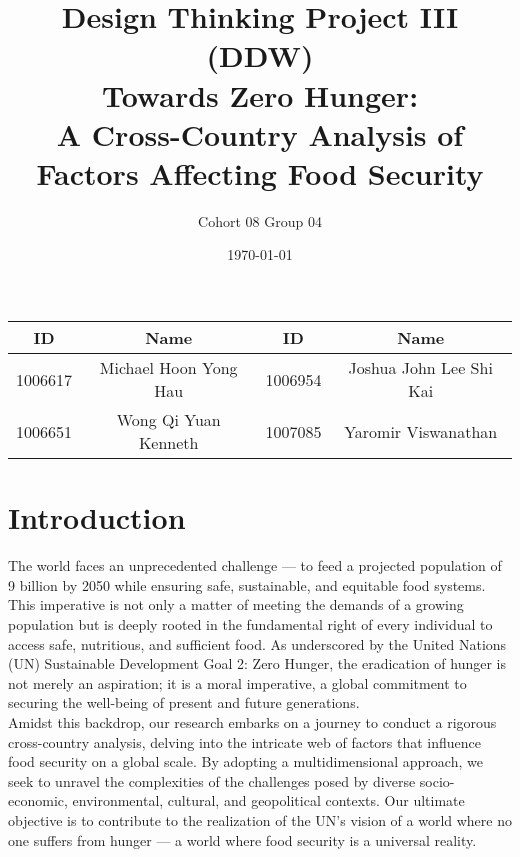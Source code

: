 \documentclass{article}
\title{\Bigg01.020 Design Thinking Project III (DDW) \\ Towards Zero Hunger: \\ A Cross-Country Analysis of Factors Affecting Food Security}
\author{Cohort 08 Group 04}
\date{\today}
\begin{document}
\maketitle
\thispagestyle{empty}

\begin{center}
\begin{tabular}{ |c|c|c|c| } 
 \hline
  ID & Name & ID & Name \\
 \hline
  1006617 & Michael Hoon Yong Hau & 1006954 & Joshua John Lee Shi Kai \\
 \hline
  1006651 & Wong Qi Yuan Kenneth & 1007085 & Yaromir Viswanathan \\
 \hline
\end{tabular}
\end{center} 



\tableofcontents

\newpage
\setcounter{page}{1}

\section{Introduction} 
The world faces an unprecedented challenge — to feed a projected population of 9 billion by 2050 while ensuring safe, sustainable, and equitable food systems. This imperative is not only a matter of meeting the demands of a growing population but is deeply rooted in the fundamental right of every individual to access safe, nutritious, and sufficient food. As underscored by the United Nations (UN) Sustainable Development Goal 2: Zero Hunger, the eradication of hunger is not merely an aspiration; it is a moral imperative, a global commitment to securing the well-being of present and future generations. \\

\noindent Amidst this backdrop, our research embarks on a journey to conduct a rigorous cross-country analysis, delving into the intricate web of factors that influence food security on a global scale. By adopting a multidimensional approach, we seek to unravel the complexities of the challenges posed by diverse socio-economic, environmental, cultural, and geopolitical contexts. Our ultimate objective is to contribute to the realization of the UN's vision of a world where no one suffers from hunger — a world where food security is a universal reality. \\ 
\end{document}
